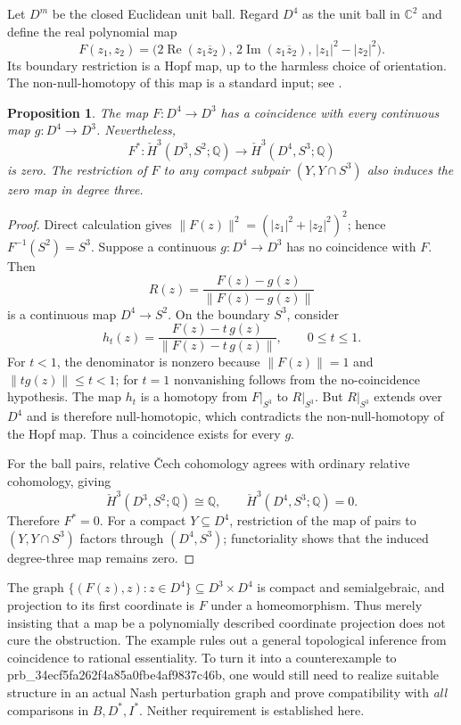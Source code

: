 \documentclass[11pt]{article}
\newtheorem{proposition}[theorem]{Proposition}
\theoremstyle{definition}
\newcommand{\Q}{\mathbb Q}
\begin{document}
Let $D^m$ be the closed Euclidean unit ball. Regard $D^4$ as the unit ball
in $\mathbb C^2$ and define the real polynomial map
\begin{equation}\label{eq:hopf}
 F(z_1,z_2)=\bigl(2\operatorname{Re}(z_1\overline z_2),\,
 2\operatorname{Im}(z_1\overline z_2),\,|z_1|^2-|z_2|^2\bigr).
\end{equation}
Its boundary restriction is a Hopf map, up to the harmless choice of
orientation. The non-null-homotopy of this map is a standard input;
see \cite[Example 4.51, p.~380; Section 4.B, p.~427]{hatcher}.

\begin{proposition}\label{prop:hopf}
The map $F:D^4\to D^3$ has a coincidence with every continuous map
$g:D^4\to D^3$. Nevertheless,
\[
 F^*:\check H^3(D^3,S^2;\Q)\longrightarrow
           \check H^3(D^4,S^3;\Q)
\]
is zero. The restriction of $F$ to any compact subpair
$(Y,Y\cap S^3)$ also induces the zero map in degree three.
\end{proposition}
\begin{proof}
Direct calculation gives
$\|F(z)\|^2=(|z_1|^2+|z_2|^2)^2$; hence
$F^{-1}(S^2)=S^3$. Suppose a continuous $g:D^4\to D^3$ has no
coincidence with $F$. Then
\[
 R(z)=\frac{F(z)-g(z)}{\|F(z)-g(z)\|}
\]
is a continuous map $D^4\to S^2$. On the boundary $S^3$, consider
\[
 h_t(z)=\frac{F(z)-t\,g(z)}{\|F(z)-t\,g(z)\|},\qquad 0\le t\le1.
\]
For $t<1$, the denominator is nonzero because $\|F(z)\|=1$ and
$\|t g(z)\|\le t<1$; for $t=1$ nonvanishing follows from the
no-coincidence hypothesis. The map $h_t$ is a homotopy from
$F|_{S^3}$ to $R|_{S^3}$. But $R|_{S^3}$ extends over $D^4$ and is
therefore null-homotopic, which contradicts the non-null-homotopy of
the Hopf map. Thus a coincidence exists for every $g$.

For the ball pairs, relative \v Cech cohomology agrees with ordinary
relative cohomology, giving
\[
 \check H^3(D^3,S^2;\Q)\cong\Q,\qquad
 \check H^3(D^4,S^3;\Q)=0.
\]
Therefore $F^*=0$. For a compact $Y\subseteq D^4$, restriction of the
map of pairs to $(Y,Y\cap S^3)$ factors through $(D^4,S^3)$;
functoriality shows that the induced degree-three map remains zero.
\end{proof}

The graph
$\{(F(z),z):z\in D^4\}\subseteq D^3\times D^4$ is compact and semialgebraic,
and projection to its first coordinate is $F$ under a homeomorphism.
Thus merely insisting that a map be a polynomially described coordinate
projection does not cure the obstruction.
The example rules out a general topological inference from coincidence to
rational essentiality. To turn it into a counterexample to prb_34ecf5fa262f4a85a0fbe4af9837c46b, one would
still need to realize suitable structure in an actual Nash perturbation
graph and prove compatibility with \emph{all} comparisons in $B,D^*,I^*$.
Neither requirement is established here.
\end{document}
